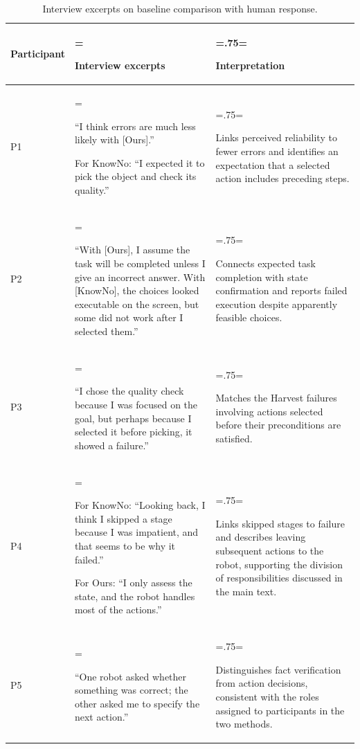 \begin{table}[!htbp]
\centering
\caption{Interview excerpts on baseline comparison with human response.}
\label{tab:app_interview_summary}
\small
\setlength{\tabcolsep}{5pt}
\renewcommand{\arraystretch}{1.12}
\begin{tabularx}{\textwidth}{@{}l>{\hsize=1.25\hsize\linewidth=\hsize\raggedright\arraybackslash}X>{\hsize=.75\hsize\linewidth=\hsize\raggedright\arraybackslash}X@{}}
\toprule
Participant & Interview excerpts & Interpretation \\
\midrule
P1 & ``I think errors are much less likely with [Ours].''\par For KnowNo: ``I expected it to pick the object and check its quality.'' & Links perceived reliability to fewer errors and identifies an expectation that a selected action includes preceding steps. \\
\addlinespace
P2 & ``With [Ours], I assume the task will be completed unless I give an incorrect answer. With [KnowNo], the choices looked executable on the screen, but some did not work after I selected them.'' & Connects expected task completion with state confirmation and reports failed execution despite apparently feasible choices. \\
\addlinespace
P3 & ``I chose the quality check because I was focused on the goal, but perhaps because I selected it before picking, it showed a failure.'' & Matches the Harvest failures involving actions selected before their preconditions are satisfied. \\
\addlinespace
P4 & For KnowNo: ``Looking back, I think I skipped a stage because I was impatient, and that seems to be why it failed.''\par For Ours: ``I only assess the state, and the robot handles most of the actions.'' & Links skipped stages to failure and describes leaving subsequent actions to the robot, supporting the division of responsibilities discussed in the main text. \\
\addlinespace
P5 & ``One robot asked whether something was correct; the other asked me to specify the next action.'' & Distinguishes fact verification from action decisions, consistent with the roles assigned to participants in the two methods. \\
\bottomrule
\end{tabularx}
\end{table}
